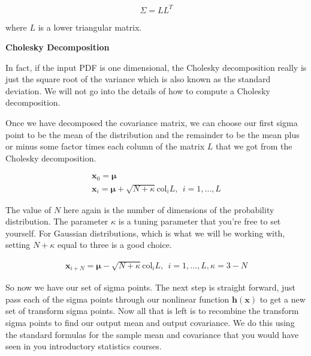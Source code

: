 \begin{equation}
\Sigma = LL^T
\end{equation}

where $L$ is a lower triangular matrix.

\begin{framed}
\theoremstyle{remark}
\begin{remark}{\textbf{Cholesky Decomposition}}

\end{remark}
\end{framed}

In fact, if the input PDF is one dimensional, the Cholesky decomposition really is
just the square root of the variance which is also known as
the standard deviation. We will not go into the details of how
to compute a Cholesky decomposition. 

Once we have decomposed the covariance matrix, we can choose our first sigma point to
be the mean of the distribution and the remainder to be the mean plus or
minus some factor times each column of the matrix $L$ that
we got from the Cholesky decomposition. 

\begin{eqnarray}
\mathbf{x}_0 = \boldsymbol{\mu} \\
\mathbf{x}_i = \boldsymbol{\mu} + \sqrt{N + \kappa} \text{col}_i L, ~~ i = 1, \ldots, L
\end{eqnarray}

The value of $N$ here again is the number of dimensions of the probability distribution. The parameter $\kappa$ is a tuning parameter
that you're free to set yourself. For Gaussian distributions, which is what we will be working with, setting $N + \kappa$ equal
to three is a good choice. 

\begin{eqnarray}
\mathbf{x}_{i + N} = \boldsymbol{\mu} - \sqrt{N + \kappa} \text{col}_i L, ~~ i = 1, \ldots, L, \kappa = 3 - N
\end{eqnarray}

So now we have our set of sigma points. The next step is straight forward, just
pass each of the sigma points through our nonlinear function $\mathbf{h}(\mathbf{x})$ to get a new
set of transform sigma points. Now all that is left is to recombine the transform sigma points to find our output mean and
output covariance. We do this using the standard formulas for the sample mean and covariance that you would have seen in you introductory statistics courses. 


